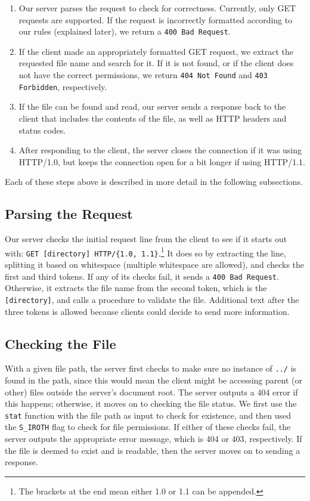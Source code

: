 \documentclass[letterpaper,11pt,twocolumn]{article}
\begin{document}
\begin{enumerate}
    \item Our server parses the request to check for correctness. Currently, only GET requests are supported. If the request is incorrectly formatted
according to our rules (explained later), we return a \texttt{400 Bad Request}.
    \item If the client made an appropriately formatted GET request, we extract the requested file name and search for it. If it is not found, or if
the client does not have the correct permissions, we return \texttt{404 Not Found} and \texttt{403 Forbidden}, respectively.
    \item If the file can be found and read, our server sends a response back to the client that includes the contents of the file, as well as HTTP
headers and status codes.
    \item After responding to the client, the server closes the connection if it was using HTTP/1.0, but keeps the connection open for a bit longer if
using HTTP/1.1. 
\end{enumerate}

Each of these steps above is described in more detail in the following subsections.

\subsection{Parsing the Request}

Our server checks the initial request line from the client to see if it starts out with: \texttt{GET [directory] HTTP/\{1.0, 1.1\}}.\footnote{The brackets at
the end mean either 1.0 or 1.1 can be appended.} It does so by extracting the line, splitting it based on whitespace (multiple whitespace are
allowed), and checks the first and third tokens. If any of its checks fail, it sends a \texttt{400 Bad Request}. Otherwise, it extracts the file name
from the second token, which is the \texttt{[directory]}, and calls a procedure to validate the file. Additional text after the three tokens is
allowed because clients could decide to send more information.

\subsection{Checking the File}

With a given file path, the server first checks to make sure no instance of \texttt{../} is found in the path, since this would mean the client might
be accessing parent (or other) files outside the server's document root. The server outputs a 404 error if this happens; otherwise, it moves on to
checking the file status. We first use the \texttt{stat} function with the file path as input to check for existence, and then used the
\texttt{S\_IROTH} flag to check for file permissions. If either of these checks fail, the server outputs the appropriate error message, which is 404
or 403, respectively. If the file is deemed to exist and is readable, then the server moves on to sending a response.
\end{document}

